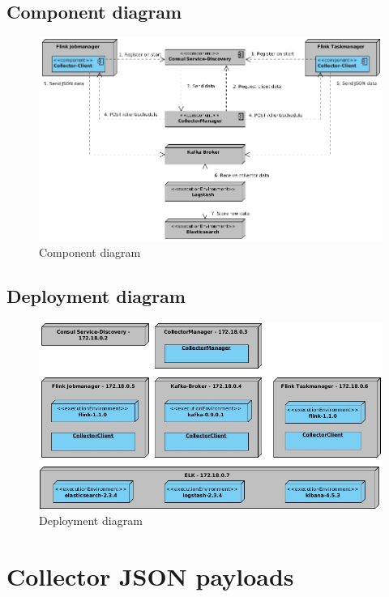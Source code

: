 \subsection{Component diagram}
\begin{figure}[H]
	\centering
	\includegraphics[width=1.0\textwidth]{../uml/component-diagram.jpg}
	\caption{Component diagram}
	\label{component-diagram}
\end{figure}

\subsection{Deployment diagram}
\begin{figure}[H]
	\centering
	\includegraphics[width=1.0\textwidth]{../uml/deployment-diagram.jpg}
	\caption{Deployment diagram}
	\label{deployment-diagram}
\end{figure}

\section{Collector JSON payloads}

